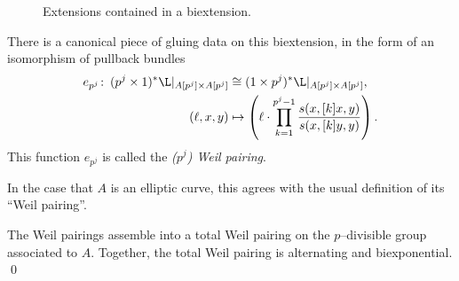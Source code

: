 \begin{definition}
\begin{figure}[htp]
\begin{center}
\end{center}
\caption{Extensions contained in a biextension.}
\end{figure}
There is a canonical piece of gluing data on this biextension, in the form of an isomorphism of pullback bundles
\begin{align*}
e_{p^j}\co (p^j \times 1)^* \L|_{A[p^j] \times A[p^j]} & \cong (1 \times p^j)^* \L|_{A[p^j] \times A[p^j]}, \\
(\ell, x, y) & \mapsto \left(\ell \cdot \prod_{k=1}^{p^j-1} \frac{s(x, [k]x, y)}{s(x, [k]y, y)} \right).
\end{align*}
This function $e_{p^j}$ is called the \textit{($p^j${\th}) Weil pairing}.
\end{definition}

\begin{remark}
In the case that $A$ is an elliptic curve, this agrees with the usual definition of its ``Weil pairing''. %
\end{remark}

\begin{lemma}
The Weil pairings assemble into a total Weil pairing on the $p$--divisible group associated to $A$.  Together, the total Weil pairing is alternating and biexponential. \qed
\end{lemma}


